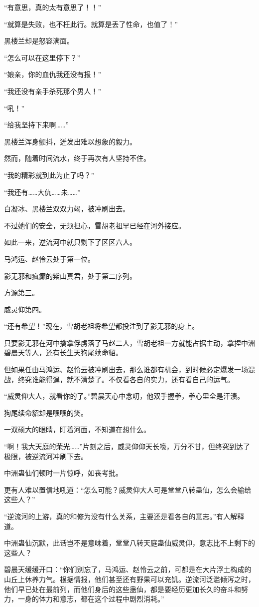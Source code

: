 \begin{this_body}
“有意思，真的太有意思了！！”

“就算是失败，也不枉此行。就算是丢了性命，也值了！”

黑楼兰却是怒容满面。

“怎么可以在这里停下？”

“娘亲，你的血仇我还没有报！”

“我还没有亲手杀死那个男人！”

“吼！”

“给我坚持下来啊……”

黑楼兰浑身颤抖，迸发出难以想象的毅力。

然而，随着时间流水，终于再次有人坚持不住。

“我的精彩就到此为止了吗？”

“我还有……大仇……未……”

白凝冰、黑楼兰双双力竭，被冲刷出去。

不过她们的安全，无须担心，雪胡老祖早已经在河外接应。

如此一来，逆流河中就只剩下了区区六人。

马鸿运、赵怜云处于第一位。

影无邪和疯癫的紫山真君，处于第二序列。

方源第三。

威灵仰第四。

“还有希望！”现在，雪胡老祖将希望都投注到了影无邪的身上。

只要影无邪在河中擒拿俘虏落了马赵二人，雪胡老祖一方就能占据主动，拿捏中洲碧晨天等人，还有长生天狗尾续命貂。

但如果任由马鸿运、赵怜云被冲刷出去，那么谁都有机会，到时候必定爆发一场混战，终究谁能得逞，就不清楚了。不仅看各自的实力，还有看自己的运气。

“威灵仰大人，就看你的了。”碧晨天心中念叨，他双手握拳，拳心里全是汗渍。

狗尾续命貂却是嘿嘿的笑。

一双硕大的眼睛，盯着河面，不知道在想什么。

“啊！我大天庭的荣光……”片刻之后，威灵仰仰天长嚎，万分不甘，但终究到达了极限，被逆流河冲刷下去。

中洲蛊仙们顿时一片惊呼，如丧考批。

更有人难以置信地吼道：“怎么可能？威灵仰大人可是堂堂八转蛊仙，怎么会输给这些人？”

“逆流河的上游，真的和修为没有什么关系，主要还是看各自的意志。”有人解释道。

中洲蛊仙沉默，此话岂不是意味着，堂堂八转天庭蛊仙威灵仰，意志比不上剩下的这些人？

碧晨天缓缓开口：“你们别忘了，马鸿运、赵怜云之前，可都是在大片浮土构成的山丘上休养力气。根据情报，他们甚至还有野果可以充饥。逆流河泛滥倾泻之时，他们早已处在最前列，而他们身后的这些蛊仙，都是要经历更加长久的奋斗和努力，一身的体力和意志，都在这个过程中剧烈消耗。”


\end{this_body}
